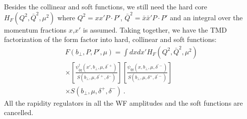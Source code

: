 \documentclass[aps,rmp,reprint,amsmath,amssymb,graphicx,longbibliography]{revtex4-1} %
\newcommand{\nn}{\nonumber}
\begin{document}
Besides the collinear and soft functions, we still need the hard core $H_F(Q^2,\bar Q^2,\mu^2)$ where $Q^2=xx'P\cdot P'$, $\bar Q^2=\bar x\bar x' P\cdot P'$ and an integral over the momentum fractions $x$,$x'$ is assumed. Taking together, we have the TMD factorization of the form factor into hard, collinear and soft functions:
\begin{align}\label{eq:form_fac_bare}
	&F(b_\perp,P,P',\mu)=\int dx dx' H_F(Q^2,\bar Q^2,\mu^2) \\ &\times \left[\frac{\psi_{\bar q q}^{\dagger}(x',b_\perp,\mu,\delta^{'+})}{S(b_\perp,\mu,\delta^{'+},\delta^-)}\right]\left[\frac{\psi_{\bar q q}(x,b_\perp,\mu,\delta^{'-})}{S(b_\perp,\mu,\delta^+,\delta^{'-})}\right]\nonumber \\
	&\times S(b_\perp,\mu,\delta^+,\delta^-) \ . \nn
\end{align}
All the rapidity regulators in all the WF amplitudes and the soft functions are cancelled.
\end{document}
